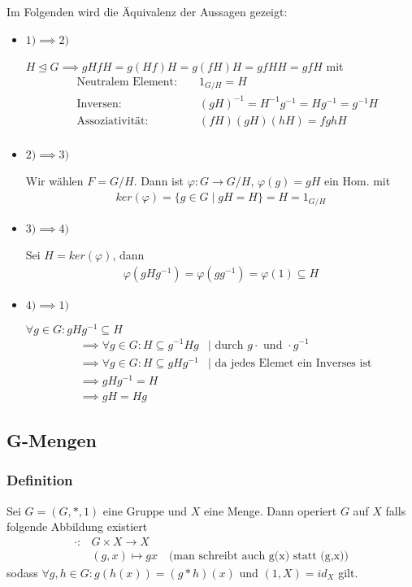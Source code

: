 \documentclass[12pt, german]{article}
\begin{document}
	Im Folgenden wird die Äquivalenz der Aussagen gezeigt: 
	\begin{itemize}
		\item $1)\implies 2)$ ~\par
		$H\trianglelefteq G \implies gHfH = g(Hf)H = g(fH)H = gfHH = gfH$ mit
		\begin{align*}
			&\text{ Neutralem Element: } &&1_{G/H} = H \\
			&\text{ Inversen: } &&(gH)^{-1} = H^{-1}g^{-1}= Hg^{-1}=g^{-1}H \\
			&\text{ Assoziativität: } &&(fH)(gH)(hH)= fghH\\
		\end{align*}
		
		\item $2)\implies 3)$ ~\par
		Wir wählen $F=G/H$.
		Dann ist $\varphi : G \to G/H $, $\varphi(g) = gH$ ein Hom. mit
		\begin{align*}
			ker(\varphi) = \{g \in G \mid gH = H\} = H = 1_{G/H}
		\end{align*}
		
		\item $3)\implies 4)$~\par
		Sei $H = ker(\varphi)$, dann
		\begin{align*}
			\varphi(gHg^{-1}) = \varphi(gg^{-1}) = \varphi(1) \subseteq H 
		\end{align*}
		
		\item $4)\implies 1)$~\par
		$\forall g \in G : gHg^{-1} \subseteq H$
		\begin{align*}
			&\implies  \forall g \in G : H \subseteq g^{-1}Hg &| \text{ durch } g\cdot \text{ und } \cdot g^{-1}\\
			&\implies \forall g \in G : H \subseteq gHg^{-1} &| \text{ da jedes Elemet ein Inverses ist}\\
			&\implies gHg^{-1} = H \\
			&\implies gH = Hg
		\end{align*}
	\end{itemize}
	
	
	
	\subsection{G-Mengen}		
	\subsubsection{Definition}
	Sei $G = (G, *, 1)$ eine Gruppe und $X$ eine Menge.
	Dann operiert $G$ auf $X$ falls folgende Abbildung existiert 
	\begin{align*}
		\cdot : &G \times X \to X \\ 
		&(g,x) \mapsto gx \quad \text{(man schreibt auch g(x) statt (g,x))}
	\end{align*}
	sodass $\forall g,h \in G: g(h(x)) = (g*h)(x)$ und $(1,X) = id_X$ gilt.
	
\end{document}
